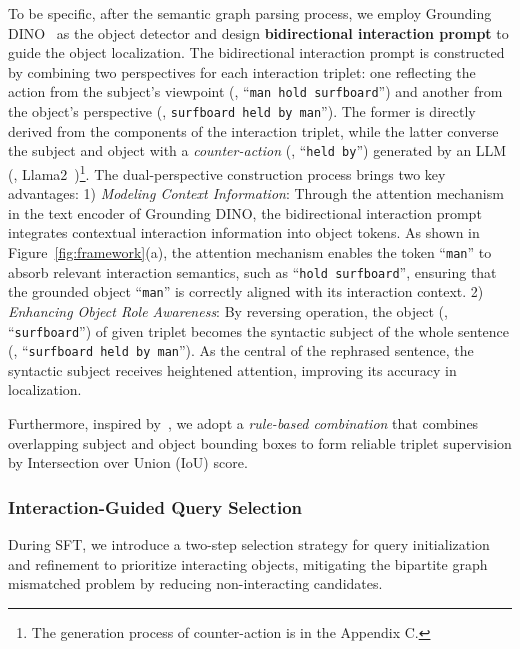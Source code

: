 To be specific, after the semantic graph parsing process, we employ Grounding DINO~\cite{liu2023grounding} as the object detector and design \textbf{bidirectional interaction prompt} to guide the object localization. The bidirectional interaction prompt is constructed by combining two perspectives for each interaction triplet: one reflecting the action from the subject’s viewpoint (\eg, ``\texttt{man hold surfboard}'') and another from the object’s perspective (\eg, \texttt{surfboard held by man}''). The former is directly derived from the components of the interaction triplet, while the latter converse the subject and object with a \textit{counter-action} (\eg, ``\texttt{held by}'') generated by an LLM (\eg, Llama2~\cite{touvron2023llama})\footnote{The generation process of counter-action is in the Appendix C.\label{footnote:counterrel_gen}}. The dual-perspective construction process brings two key advantages: 1) \textit{Modeling Context Information}: Through the attention mechanism in the text encoder of Grounding DINO, the bidirectional interaction prompt integrates contextual interaction information into object tokens. As shown in Figure~\ref{fig:framework}(a), the attention mechanism enables the token ``\texttt{man}'' to absorb relevant interaction semantics, such as ``\texttt{hold surfboard}'', ensuring that the grounded object ``\texttt{man}'' is correctly aligned with its interaction context.
2) \textit{Enhancing Object Role Awareness}: By reversing operation, the object (\eg, ``\texttt{surfboard}'') of given triplet becomes the syntactic subject of the whole sentence (\eg, ``\texttt{surfboard held by man}''). As the central of the rephrased sentence, the syntactic subject receives heightened attention, improving its accuracy in localization. 

Furthermore, inspired by~\cite{li2022integrating,kim2024llm4sgg}, we adopt a \textit{rule-based combination} that combines overlapping subject and object bounding boxes to form reliable triplet supervision by Intersection over Union (IoU) score.

\subsubsection{Interaction-Guided Query Selection}
\label{sec:iqs}
During SFT, we introduce a two-step selection strategy for query initialization and refinement to prioritize interacting objects, mitigating the bipartite graph mismatched problem by reducing non-interacting candidates. 


